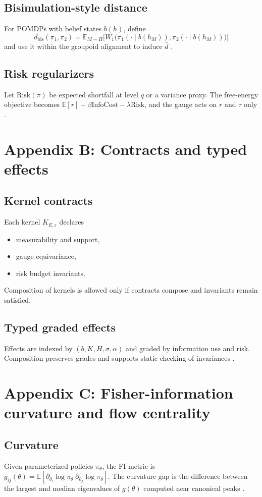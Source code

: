 \documentclass[11pt]{article}
\newcommand{\E}{\mathbb{E}}
\newcommand{\1}{\mathbbm{1}}
\newcommand{\Wone}{W_1}
\begin{document}
\subsection{Bisimulation-style distance}
For POMDPs with belief states $b(h)$, define
\[
d_{\mathrm{bis}}(\pi_1,\pi_2) = \E_{M \sim \Pi}\bigl[\Wone\bigl(\pi_1(\cdot \mid b(h_M)), \pi_2(\cdot \mid b(h_M))\bigr)\bigr]
\]
and use it within the groupoid alignment to induce $\bar d$ \parencite{Villani2009}.

\subsection{Risk regularizers}
Let $\mathrm{Risk}(\pi)$ be expected shortfall at level $q$ or a variance proxy. The free-energy objective becomes $\E[r] - \beta \mathrm{InfoCost} - \lambda \mathrm{Risk}$, and the gauge acts on $r$ and $\tau$ only \parencite{CoverThomas2006}.

\section{Appendix B: Contracts and typed effects}
\subsection{Kernel contracts}
Each kernel $K_{E,\varepsilon}$ declares
\begin{itemize}[leftmargin=2em]
    \item measurability and support,
    \item gauge equivariance,
    \item risk budget invariants.
\end{itemize}
Composition of kernels is allowed only if contracts compose and invariants remain satisfied.

\subsection{Typed graded effects}
Effects are indexed by $(b,K,H,\sigma,\alpha)$ and graded by information use and risk. Composition preserves grades and supports static checking of invariances \parencite{Topkis1998,MilgromShannon1994}.

\section{Appendix C: Fisher-information curvature and flow centrality}
\subsection{Curvature}
Given parameterized policies $\pi_\theta$, the FI metric is $g_{ij}(\theta) = \E[\partial_{\theta_i}\log \pi_\theta \; \partial_{\theta_j}\log \pi_\theta]$. The curvature gap is the difference between the largest and median eigenvalues of $g(\theta)$ computed near canonical peaks \parencite{CoverThomas2006}.
\end{document}
